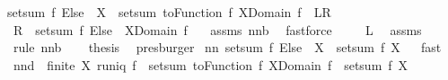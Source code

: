\begin{isabellebody}
{\isachardoublequoteopen}setsum\ {\isacharparenleft}f\ Else\ {}{\isacharparenright}\ X\ {\isacharequal}\ setsum\ {\isacharparenleft}toFunction\ f{\isacharparenright}\ {\isacharparenleft}X{\isasyminter}Domain\ f{\isacharparenright}{\isachardoublequoteclose}\ {\isacharparenleft}\ {\isachardoublequoteopen}{\isacharquery}L{\isacharequal}{\isacharquery}R{\isachardoublequoteclose}{\isacharparenright}\ \isanewline
%
\isadelimproof
%
\endisadelimproof
%
\isatagproof
{}\isamarkupfalse%
\ {\isacharminus}\isanewline
{}\isamarkupfalse%
\ {\isachardoublequoteopen}{\isacharquery}R\ {\isacharequal}\ setsum\ {\isacharparenleft}f\ Else\ {}{\isacharparenright}\ {\isacharparenleft}X{\isasyminter}Domain\ f{\isacharparenright}\ {\isachardoublequoteclose}\ \isamarkupfalse%
\ assms{\isacharparenleft}{}{\isacharparenright}\ nn{}{}b\ \isamarkupfalse%
\ fastforce\isanewline
{}\isamarkupfalse%
\ \isamarkupfalse%
\ {\isachardoublequoteopen}{\isachardot}{\isachardot}{\isachardot}\ {\isacharequal}\ {\isacharquery}L{\isachardoublequoteclose}\ \isamarkupfalse%
\ assms{\isacharparenleft}{}{\isacharparenright}\ \isamarkupfalse%
\ {\isacharparenleft}rule\ nn{}{}b{\isacharparenright}\ \isamarkupfalse%
\ \isamarkupfalse%
\ {\isacharquery}thesis\ \isamarkupfalse%
\ presburger\isanewline
{}\isamarkupfalse%
%
\endisatagproof
{\isafoldproof}%
%
\isadelimproof
\isanewline
%
\endisadelimproof
\isanewline
{}\isamarkupfalse%
\ nn{}{}{\isacharcolon}\ {\isachardoublequoteopen}setsum\ {\isacharparenleft}f\ Else\ {}{\isacharparenright}\ X\ {\isacharequal}\ setsum{\isacharprime}\ f\ X{\isachardoublequoteclose}%
\isadelimproof
\ %
\endisadelimproof
%
\isatagproof
{}\isamarkupfalse%
\ fast%
\endisatagproof
{\isafoldproof}%
%
\isadelimproof
%
\endisadelimproof
\isanewline
\isanewline
{}\isamarkupfalse%
\ nn{}{}d{\isacharcolon}\ \ {\isachardoublequoteopen}finite\ X{\isachardoublequoteclose}\ {\isachardoublequoteopen}runiq\ f{\isachardoublequoteclose}\ \ {\isachardoublequoteopen}setsum\ {\isacharparenleft}toFunction\ f{\isacharparenright}\ {\isacharparenleft}X{\isasyminter}Domain\ f{\isacharparenright}\ {\isacharequal}\ setsum{\isacharprime}\ f\ X{\isachardoublequoteclose}\isanewline

\end{isabellebody}

